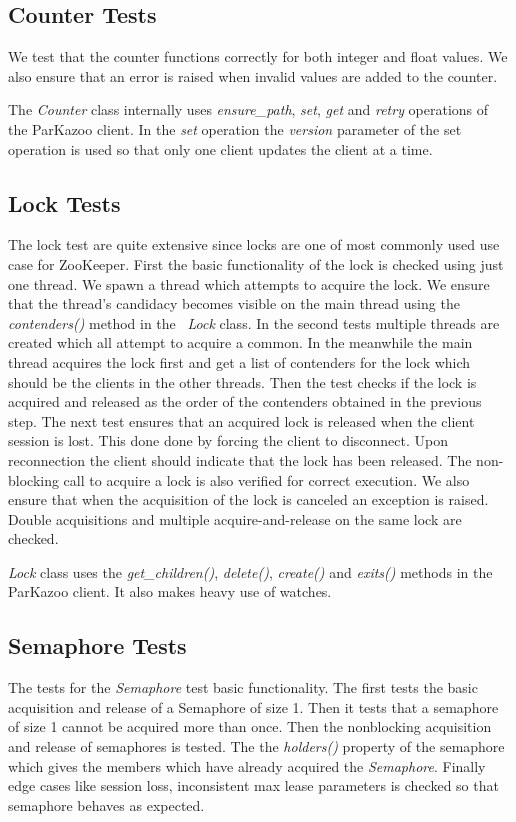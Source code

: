 	\subsection{Counter Tests}
	
	We test that the counter functions correctly for both integer and float values. We also ensure that an error is raised when invalid values are added to the counter.
	
	The \textit{Counter} class internally uses \textit{ensure\_path}, \textit{set}, \textit{get} and \textit{retry} operations of the ParKazoo client. In the \textit{set} operation the \textit{version} parameter of the set operation is used so that only one client updates the client at a time.
	
	\subsection{Lock Tests}
	The lock test are quite extensive since locks are one of most commonly used use case for ZooKeeper. First the basic functionality of the lock is checked using just one thread. We spawn a thread which attempts to acquire the lock. We ensure that the thread's candidacy becomes visible on the main thread using the \textit{contenders()} method in the ~\textit{Lock} class. In the second tests multiple threads are created which all attempt to acquire a common. In the meanwhile the main thread acquires the lock first and get a list of contenders for the lock which should be the clients in the other threads. Then the test checks if the lock is acquired and released as the order of the contenders obtained in the previous step. The next test ensures that an acquired lock is released when the client session is lost. This done done by forcing the client to disconnect. Upon reconnection the client should indicate that the lock has been released. The non-blocking call to acquire a lock is also verified for correct execution. We also ensure that when the acquisition of the lock is canceled an exception is raised. Double acquisitions and multiple acquire-and-release on the same lock are checked.
	
	\textit{Lock} class uses the \textit{get\_children()}, \textit{delete()}, \textit{create()} and \textit{exits()} methods in the ParKazoo client. It also makes heavy use of watches.
	
	\subsection{Semaphore Tests}
	The tests for the \textit{Semaphore} test basic functionality. The first tests the basic acquisition and release of a Semaphore of size 1. Then it tests that a semaphore of size 1 cannot be acquired more than once. Then the nonblocking acquisition and release of semaphores is tested. The the \textit{holders()} property of the semaphore which gives the members which have already acquired the \textit{Semaphore}. Finally edge cases like session loss, inconsistent max lease parameters is checked so that semaphore behaves as expected.
		
